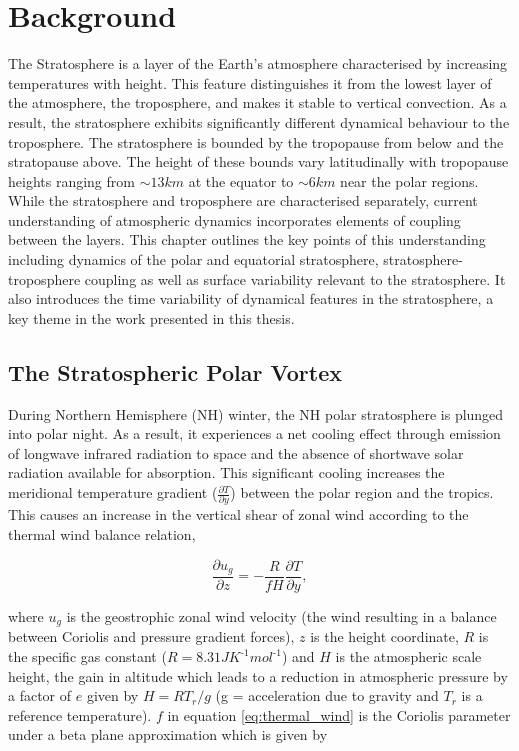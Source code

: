 \chapter{Background}
\label{cha:background}
The Stratosphere is a layer of the Earth's atmosphere characterised by increasing temperatures with height. This feature distinguishes it from the lowest layer of the atmosphere, the troposphere, and makes it stable to vertical convection. As a result, the stratosphere exhibits significantly different dynamical behaviour to the troposphere. The stratosphere is bounded by the tropopause from below and the stratopause above. The height of these bounds vary latitudinally with tropopause heights ranging from  $\sim 13km$ at the equator to $\sim 6km$ near the polar regions. While the stratosphere and troposphere are characterised separately, current understanding of atmospheric dynamics incorporates elements of coupling between the layers. This chapter outlines the key points of this understanding including dynamics of the polar and equatorial stratosphere, stratosphere-troposphere coupling as well as surface variability relevant to the stratosphere. It also introduces the time variability of dynamical features in the stratosphere, a key theme in the work presented in this thesis. 

\section{The Stratospheric Polar Vortex}
\label{sec:polar_vortex}
During Northern Hemisphere (NH) winter, the NH polar stratosphere is plunged into polar night. As a result, it experiences a net cooling effect through emission of longwave infrared radiation to space and the absence of shortwave solar radiation available for absorption. This significant cooling increases the meridional temperature gradient ($\frac{\partial T}{\partial y}$) between the polar region and the tropics. This causes an increase in the vertical shear of zonal wind according to the thermal wind balance relation,

\begin{equation} \label{eq:thermal_wind}
\frac{\partial u_g}{\partial z} = -\frac{R}{f H}\frac{\partial T}{\partial y},
\end{equation}

where $u_g$ is the geostrophic zonal wind velocity (the wind resulting in a balance between Coriolis and pressure gradient forces), $z$ is the height coordinate, $R$ is the specific gas constant ($R = 8.31JK^{\text{-} 1}mol^{\text{-} 1}$) and $H$ is the atmospheric scale height, the gain in altitude which leads to a reduction in atmospheric pressure by a factor of $e$ given by $H = RT_r/g$ (g = acceleration due to gravity and $T_r$ is a reference temperature). $f$ in equation \ref{eq:thermal_wind} is the Coriolis parameter under a beta plane approximation which is given by

